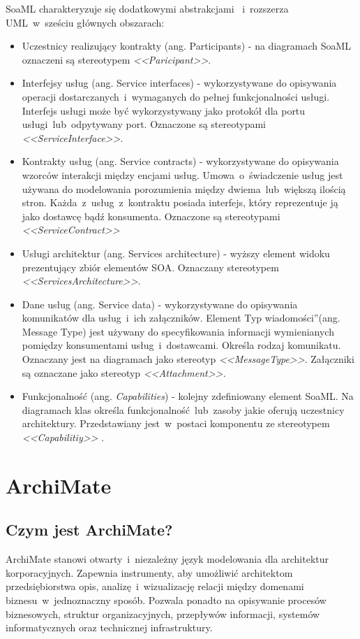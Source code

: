 SoaML charakteryzuje się dodatkowymi abstrakcjami \cite{PlatIntGor}~i~rozszerza UML~w~sześciu głównych obszarach: 
\begin{itemize}
\item{Uczestnicy realizujący kontrakty (ang. Participants) - na diagramach SoaML oznaczeni są stereotypem \emph{<<Paricipant>>}.}
\item{Interfejsy usług (ang. Service interfaces) - wykorzystywane do opisywania operacji dostarczanych~i~wymaganych do pełnej funkcjonalności usługi. Interfejs usługi może być wykorzystywany jako protokół dla portu usługi~lub~odpytywany port. Oznaczone są stereotypami \emph{<<ServiceInterface>>}.}
\item{Kontrakty usług (ang. Service contracts) - wykorzystywane do opisywania wzorców interakcji między encjami usług. Umowa~o~świadczenie usług jest używana do modelowania porozumienia między dwiema~lub~większą ilością stron. Każda~z~usług~z~kontraktu posiada interfejs, który reprezentuje ją jako dostawcę bądź konsumenta. Oznaczone są stereotypami \emph{<<ServiceContract>>}}
\item{Usługi architektur (ang. Services architecture) - wyższy element widoku prezentujący zbiór elementów SOA. Oznaczany stereotypem \emph{<<ServicesArchitecture>>}.}
\item{Dane usług (ang. Service data) - wykorzystywane do opisywania komunikatów dla usług~i~ich załączników. Element \quotedblbase Typ wiadomości\textquotedblright (ang. Message Type) jest używany do specyfikowania informacji wymienianych pomiędzy konsumentami usług~i~dostawcami. Określa rodzaj komunikatu. Oznaczany jest na diagramach jako stereotyp \emph{<<MessageType>>}. Załączniki są oznaczane jako stereotyp \emph{<<Attachment>>.}}
\item{Funkcjonalność (ang. \emph{Capabilities}) - kolejny zdefiniowany element SoaML. Na diagramach klas określa funkcjonalność~lub~zasoby jakie oferują uczestnicy architektury. Przedstawiany jest~w~postaci komponentu ze stereotypem \emph{<<Capabilitiy>>} \cite{SoaMLErvBase}.}
\end{itemize} 


\section{ArchiMate}
\subsection{Czym jest ArchiMate?}
ArchiMate stanowi otwarty~i~niezależny język modelowania dla architektur korporacyjnych. Zapewnia instrumenty, aby umożliwić architektom przedsiębiorstwa opis, analizę~i~wizualizację relacji między domenami biznesu~w~jednoznaczny sposób. Pozwala ponadto na opisywanie procesów biznesowych, struktur organizacyjnych, przepływów informacji, systemów informatycznych oraz technicznej infrastruktury.

